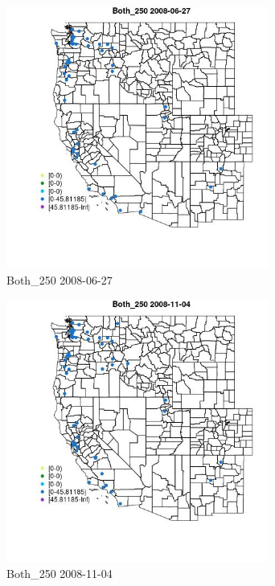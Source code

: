 \begin{figure} 
\centering  
\includegraphics[width=0.77\textwidth]{Code_Outputs/Report_ML_input_PM25_Step4_part_e_de_duplicated_aves_MapObsBoth_2502008-06-27.jpg} 
\caption{\label{fig:Report_ML_input_PM25_Step4_part_e_de_duplicated_avesMapObsBoth_2502008-06-27}Both_250 2008-06-27} 
\end{figure} 
 

\clearpage 

\begin{figure} 
\centering  
\includegraphics[width=0.77\textwidth]{Code_Outputs/Report_ML_input_PM25_Step4_part_e_de_duplicated_aves_MapObsBoth_2502008-11-04.jpg} 
\caption{\label{fig:Report_ML_input_PM25_Step4_part_e_de_duplicated_avesMapObsBoth_2502008-11-04}Both_250 2008-11-04} 
\end{figure} 
 

